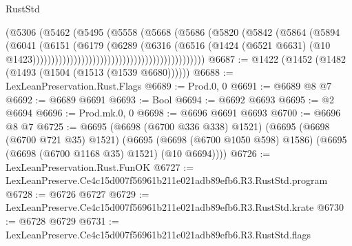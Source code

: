 \begin{lexlean}{RustStd}
\begin{coremodule}
                                                            (@5306
                                                              (@5462
                                                                (@5495
                                                                  (@5558
                                                                    (@5668
                                                                      (@5686
                                                                        (@5820
                                                                          (@5842
                                                                            (@5864
                                                                              (@5894
                                                                                (@6041
                                                                                  (@6151
                                                                                    (@6179
                                                                                      (@6289
                                                                                        (@6316
                                                                                          (@6516
                                                                                            (@1424
                                                                                              (@6521
                                                                                                @6631)
                                                                                              (@10
                                                                                                @1423))))))))))))))))))))))))))))))))))))))))))))))
@6687 := @1422 (@1452 (@1482 (@1493 (@1504 (@1513 (@1539 @6680))))))
@6688 := LexLeanPreservation.Rust.Flags
@6689 := Prod.{0, 0}
@6691 := @6689 @8 @7
@6692 := @6689 @6691
@6693 := Bool
@6694 := @6692 @6693
@6695 := @2 @6694
@6696 := Prod.mk.{0, 0}
@6698 := @6696 @6691 @6693
@6700 := @6696 @8 @7
@6725 := @6695
    (@6698 (@6700 @336 @338) @1521)
    (@6695
      (@6698 (@6700 @721 @35) @1521)
      (@6695 (@6698 (@6700 @1050 @598) @1586) (@6695 (@6698 (@6700 @1168 @35) @1521) (@10 @6694))))
@6726 := LexLeanPreservation.Rust.FunOK
@6727 := LexLeanPreserve.Ce4c15d007f56961b211e021adb89efb6.R3.RustStd.program
@6728 := @6726 @6727
@6729 := LexLeanPreserve.Ce4c15d007f56961b211e021adb89efb6.R3.RustStd.krate
@6730 := @6728 @6729
@6731 := LexLeanPreserve.Ce4c15d007f56961b211e021adb89efb6.R3.RustStd.flags

\end{coremodule}
\end{lexlean}

